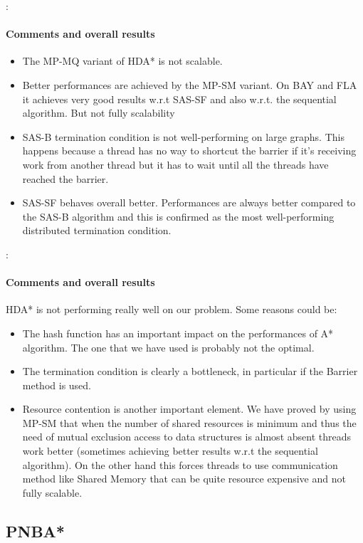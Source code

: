 \documentclass[12pt]{beamer}
\begin{document}
	\begin{frame}[allowframebreaks]{\secname : \subsecname}
		\framesubtitle{Comments and overall results}
		\begin{itemize}
			\item The MP-MQ variant of HDA* is not scalable.
	  		\item Better performances are achieved by the MP-SM variant. On BAY and FLA it achieves very
				  good results w.r.t SAS-SF and also w.r.t. the sequential algorithm. But not
				  fully scalability
	  		\item SAS-B termination condition is not well-performing on large graphs. This 
					happens because a thread has no way to shortcut the barrier if it's receiving work from
					another thread but it has to wait until all the threads have reached the barrier.
	  		\item SAS-SF behaves overall better. Performances are always
					better compared to the SAS-B algorithm and this is confirmed as the most well-performing
					distributed termination condition.
		\end{itemize}
	\end{frame}
	\begin{frame}{\secname : \subsecname}
		\framesubtitle{Comments and overall results}
		HDA* is not performing really well on our problem. Some reasons could be:
		\begin{itemize}
			\item The hash function has an important impact on the performances of A* algorithm. The one that
			we have used is probably not the optimal.
			\item The termination condition is clearly a bottleneck, in particular if the Barrier method
					is used.
			\item Resource contention is another important element. We have proved by using MP-SM that when the number of shared resources
					is minimum and thus the need of mutual exclusion access to data structures is almost absent threads work
					better (sometimes achieving better results w.r.t the sequential algorithm). On the other hand this forces
					threads to use communication method like Shared Memory that can be quite resource expensive and not fully
					scalable.
		  \end{itemize}
	\end{frame}
	\subsection{PNBA*}
\end{document}
